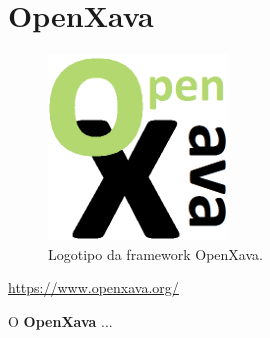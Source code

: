 \section{OpenXava}
\label{subsec:openxava}

\begin{figure}[H]
    \centering
    \includegraphics[scale=0.25]{images/openxava.png}
    \caption{Logotipo da framework OpenXava.}
    \label{fig:openxava}
\end{figure}

\href{https://www.openxava.org/}{https://www.openxava.org/}

\hspace{5mm} O \textbf{OpenXava} ...